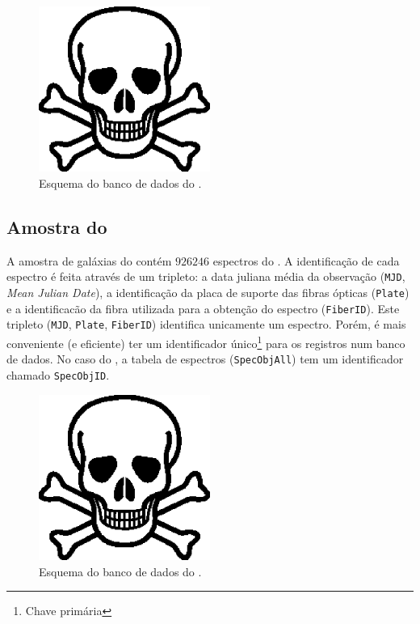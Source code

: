 \begin{figure}
	\includegraphics[width=0.5\textwidth]{figuras/test.eps}
	\caption[Esquema do banco de dados do \starlight.]
	{Esquema do banco de dados do \starlight.}
	\label{fig:EsquemaBDStarlight}
\end{figure}

\subsection{Amostra do \starlight}
\label{sec:Crossmatch:AmostraStarlight}

A amostra de galáxias do \starlight contém $926246$ espectros do \SDSS. A
identificação de cada espectro é feita através de um tripleto: a data juliana
média da observação ({\tt MJD}, {\em Mean Julian Date}), a identificação da
placa de suporte das fibras ópticas ({\tt Plate}) e a identificacão da fibra
utilizada para a obtenção do espectro ({\tt FiberID}). Este tripleto ({\tt MJD},
{\tt Plate}, {\tt FiberID}) identifica unicamente um espectro. Porém, é mais
conveniente (e eficiente) ter um identificador único{\footnote{Chave primária
\fixme}} para os registros num banco de dados. No caso do \SDSS, a tabela de
espectros ({\tt SpecObjAll}) tem um identificador chamado {\tt SpecObjID}.

\begin{figure}
	\includegraphics[width=0.5\textwidth]{figuras/test.eps}
	\caption[Esquema do banco de dados do \SDSS.]
	{Esquema do banco de dados do \SDSS.}
	\label{fig:EsquemaSDSS}
\end{figure}

